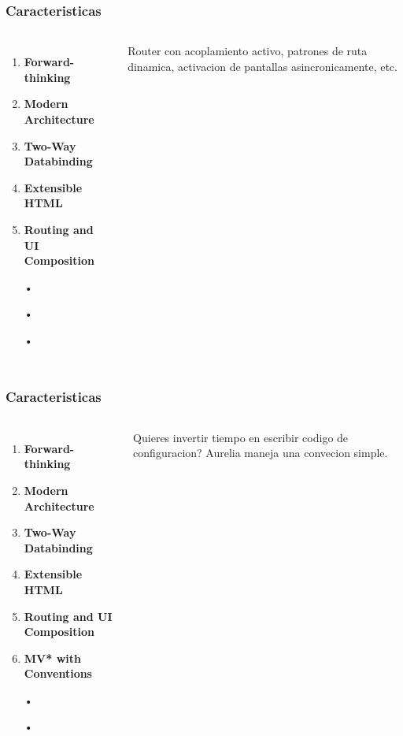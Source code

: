 \documentclass{beamer}
\begin{document}
\begin{frame}
\frametitle{Caracteristicas}
\begin{columns}[c] %

\begin{enumerate}
\item \textbf{Forward-thinking}
\item \textbf{Modern Architecture}
\item \textbf{Two-Way Databinding}
\item \textbf{Extensible HTML}
\item \textbf{Routing and UI Composition}
\item[•]
\item[•]
\item[•]
\end{enumerate}

Router con acoplamiento activo, patrones de ruta dinamica, activacion de pantallas asincronicamente, etc.
\end{columns}
\end{frame}

\begin{frame}
\frametitle{Caracteristicas}
\begin{columns}[c] %

\begin{enumerate}
\item \textbf{Forward-thinking}
\item \textbf{Modern Architecture}
\item \textbf{Two-Way Databinding}
\item \textbf{Extensible HTML}
\item \textbf{Routing and UI Composition}
\item \textbf{MV* with Conventions}
\item[•]
\item[•]
\end{enumerate}

Quieres invertir tiempo en escribir codigo de configuracion? Aurelia maneja una convecion simple.
\end{columns}
\end{frame}
\end{document}
